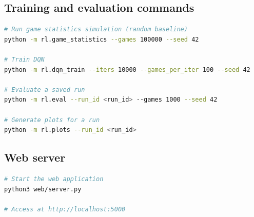 \documentclass[11pt]{article}
\begin{document}
\subsection{Training and evaluation commands}
\begin{lstlisting}[language=bash]
# Run game statistics simulation (random baseline)
python -m rl.game_statistics --games 100000 --seed 42

# Train DQN
python -m rl.dqn_train --iters 10000 --games_per_iter 100 --seed 42

# Evaluate a saved run
python -m rl.eval --run_id <run_id> --games 1000 --seed 42

# Generate plots for a run
python -m rl.plots --run_id <run_id>
\end{lstlisting}

\subsection{Web server}
\begin{lstlisting}[language=bash]
# Start the web application
python3 web/server.py

# Access at http://localhost:5000
\end{lstlisting}
\end{document}
